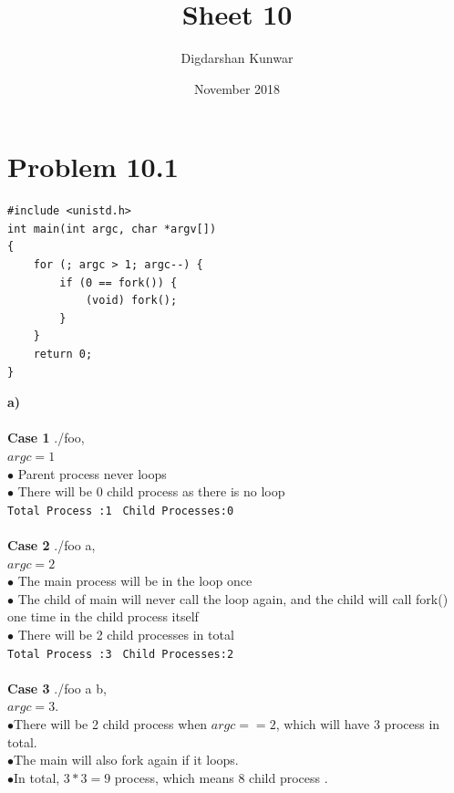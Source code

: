 \documentclass{article}
\title{Sheet 10}
\author{Digdarshan Kunwar}
\date{November 2018}
\begin{document}
\maketitle
\section*{Problem 10.1}
\begin{verbatim}
#include <unistd.h>
int main(int argc, char *argv[])
{
    for (; argc > 1; argc--) {
        if (0 == fork()) {
            (void) fork();  
        }
    }
    return 0;
}
\end{verbatim}
\textbf{a)}\\\\
\textbf{Case 1} ./foo, \\
$ argc = 1$  \\
$\bullet$ Parent process never loops\\
$\bullet$ There will be 0 child process as there is no loop \\

\texttt{Total Process :1 } 
\texttt{Child Processes:0}\\
\\
\textbf{Case 2} ./foo a,\\
$ argc = 2$\\
$\bullet$ The main process will be in the loop once\\
$\bullet$ The  child of main will never call the loop again,
and the  child will call fork() one time in the child process itself\\
$\bullet$ There will be 2 child processes in total \\

\texttt{Total Process :3 } 
\texttt{Child Processes:2}\\
\\
\textbf{Case 3} ./foo a b,\\ 
$ argc = 3$.\\
$\bullet$There will be 2 child process when $argc == 2$, which will have 3 process in total.\\
$\bullet$The main will also fork again if it loops.\\
$\bullet$In total, $ 3 * 3 = 9$ process, which means 8 child process . \\
\end{document}
